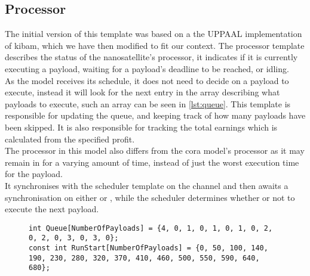 \subsection{Processor}
The initial version of this template was based on a the UPPAAL implementation of \gls{kibam}, which we have then modified to fit our context.
The processor template describes the status of the nanosatellite's processor, it indicates if it is currently executing a payload, waiting for a payload's deadline to be reached, or idling.\\
As the model receives its schedule, it does not need to decide on a payload to execute, instead it will look for the next entry in the array describing what payloads to execute, such an array can be seen in \cref{lst:queue}.
This template is responsible for updating the queue, and keeping track of how many payloads have been skipped.
It is also responsible for tracking the total earnings which is calculated from the specified profit.\\
The processor in this model also differs from the \gls{cora} model's processor as it may remain in  for a varying amount of time, instead of just the worst execution time for the payload.\\
It synchronises with the scheduler template on the channel  and then awaits a synchronisation on either  or , while the scheduler determines whether or not to execute the next payload.
\begin{figure}[H]
	\begin{lstlisting}[language=my_c, caption={Payload queue with start times, extracted from the schedule}, label=lst:queue, firstnumber=57]
int Queue[NumberOfPayloads] = {4, 0, 1, 0, 1, 0, 1, 0, 2, 0, 2, 0, 3, 0, 3, 0};
const int RunStart[NumberOfPayloads] = {0, 50, 100, 140, 190, 230, 280, 320, 370, 410, 460, 500, 550, 590, 640, 680};
	\end{lstlisting}
\end{figure}


